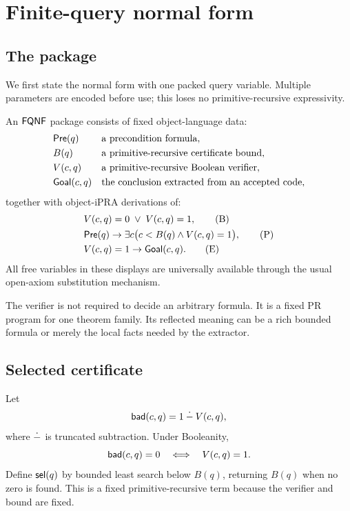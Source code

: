 \section{Finite-query normal form}

\subsection{The package}

We first state the normal form with one packed query variable.  Multiple
parameters are encoded before use; this loses no primitive-recursive
expressivity.

\begin{definition}
An \(\mathsf{FQNF}\) package consists of fixed object-language data:
\begin{align*}
  &\mathsf{Pre}(q) &&\text{a precondition formula},\\
  &B(q) &&\text{a primitive-recursive certificate bound},\\
  &V(c,q) &&\text{a primitive-recursive Boolean verifier},\\
  &\mathsf{Goal}(c,q) &&\text{the conclusion extracted from an accepted code},
\end{align*}
together with object-iPRA derivations of:
\begin{align}
  &V(c,q)=0\;\vee\;V(c,q)=1,
      \tag{B}\label{eq:bool}\\
  &\mathsf{Pre}(q)\to\exists c\bigl(c<B(q)\wedge V(c,q)=1\bigr),
      \tag{P}\label{eq:prod}\\
  &V(c,q)=1\to\mathsf{Goal}(c,q).
      \tag{E}\label{eq:extract}
\end{align}
All free variables in these displays are universally available through the
usual open-axiom substitution mechanism.
\end{definition}

The verifier is not required to decide an arbitrary formula.  It is a fixed PR
program for one theorem family.  Its reflected meaning can be a rich bounded
formula or merely the local facts needed by the extractor.

\subsection{Selected certificate}

Let
\[
  \mathsf{bad}(c,q)=1\mathbin{\dot{-}} V(c,q),
\]
where \(\mathbin{\dot{-}}\) is truncated subtraction.  Under Booleanity,
\[
  \mathsf{bad}(c,q)=0 \quad\Longleftrightarrow\quad V(c,q)=1.
\]
Define \(\mathsf{sel}(q)\) by bounded least search below \(B(q)\), returning \(B(q)\)
when no zero is found.  This is a fixed primitive-recursive term because the
verifier and bound are fixed.

